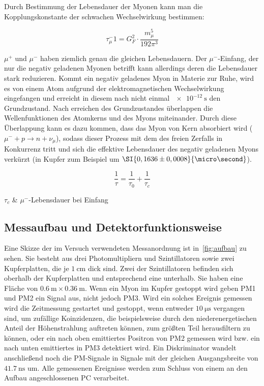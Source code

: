 \documentclass[slug=LM, room=Andreas-Schubert-Bau\,\ K\ 1A, supervisor=Anne-Sophie\ Berthold, coursedate=13.\ 12.\ 2019]{../../Lab_Report_LaTeX/lab_report}
\begin{document}
Durch Bestimmung der Lebensdauer der Myonen kann man die Kopplungskonstante der schwachen
Wechselwirkung bestimmen:

\begin{equation} \label{eq:kopplkonst}
	\tau_\mu^-1 = G_F^2 \cdot \frac{m_\mu^5}{192 \pi^3}
\end{equation}

\(\mu^+\) und \(\mu^-\) haben ziemlich genau die gleichen Lebensdauern. 
Der \(\mu^-\)-Einfang, der nur die negativ geladenen Myonen betrifft kann allerdings deren
die Lebensdauer stark reduzieren.
Kommt ein negativ geladenes Myon in Materie zur Ruhe, wird es von einem Atom aufgrund der
elektromagnetischen Wechselwirkung eingefangen und erreicht in diesem nach nicht einmal
\(\SI{e-12}{\second}\) den Grundzustand. Nach erreichen des Grundzustandes überlappen die
Wellenfunktionen des Atomkerns und des Myons miteinander. Durch diese Überlappung kann es dazu
kommen, dass das Myon von Kern absorbiert wird (\(\mu^- + p \rightarrow n + \nu_\mu\)), sodass 
dieser Prozess mit dem des freien Zerfalls in Konkurrenz tritt und sich die effektive Lebensdauer 
des negativ geladenen Myons verkürzt (in Kupfer zum Beispiel um \(\SI{0,1636 \pm 0,0008}{\micro\second}\)).

\begin{equation}\label{eq:efflebenszeit}
	\frac{1}{\tau} = \frac{1}{\tau_0} + \frac{1}{\tau_c}
\end{equation}

\begin{conditions}
	\(\tau_c\) & \(\mu^-\)-Lebensdauer bei Einfang
\end{conditions}

\subsection{Messaufbau und Detektorfunktionsweise}
\label{sec:aufbau}

Eine Skizze der im Versuch verwendeten Messanordnung ist in~\ref{fig:aufbau} zu sehen.
Sie besteht aus drei Photomultipliern und Szintillatoren sowie zwei Kupferplatten, die je
\(\SI{1}{\centi\metre}\) dick sind. Zwei der Szintillatoren befinden sich oberhalb der Kupferplatten
und entsprechend eine unterhalb. Sie haben eine Fläche von \(\SI{0,6}{\metre} \times \SI{0,36}{\metre}\).
Wenn ein Myon im Kupfer gestoppt wird geben PM1 und PM2 ein Signal aus, nicht jedoch PM3. Wird ein
solches Ereignis gemessen wird die Zeitmessung gestartet und gestoppt, wenn entweder 
\(\SI{10}{\micro\second}\) vergangen sind, um zufällige Koinzidenzen, die beispielsweise durch
den niederenergetischen Anteil der Höhenstrahlung auftreten können, zum größten Teil
herausfiltern zu können, oder
ein nach oben emittiertes Positron von PM2 gemessen wird bzw. ein nach unten emittiertes in
PM3 detektiert wird. Ein Diskriminator wandelt anschließend noch die PM-Signale in Signale mit der
gleichen Ausgangsbreite von \(\SI{41,7}{\nano\second}\) um. Alle gemessenen Ereignisse werden
zum Schluss von einem an den Aufbau angeschlossenen PC verarbeitet.
\end{document}
